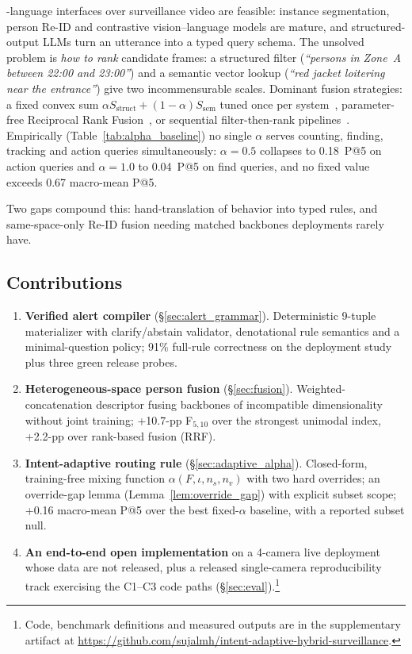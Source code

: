 ﻿\documentclass[conference]{IEEEtran}
\theoremstyle{plain}
\begin{document}
-language interfaces over surveillance video are feasible: instance segmentation, person Re-ID and contrastive vision--language models are mature, and structured-output LLMs turn an utterance into a typed query schema. The unsolved problem is \emph{how to rank} candidate frames: a structured filter (\textit{``persons in Zone~A between 22:00 and 23:00''}) and a semantic vector lookup (\textit{``red jacket loitering near the entrance''}) give two incommensurable scales. Dominant fusion strategies: a fixed convex sum $\alpha S_{\text{struct}} + (1-\alpha) S_{\text{sem}}$ tuned once per system~\cite{b7,b12,b29}, parameter-free Reciprocal Rank Fusion~\cite{b27}, or sequential filter-then-rank pipelines~\cite{b30}. Empirically (Table~\ref{tab:alpha_baseline}) no single $\alpha$ serves counting, finding, tracking and action queries simultaneously: $\alpha=0.5$ collapses to 0.18~P@5 on action queries and $\alpha=1.0$ to 0.04~P@5 on find queries, and no fixed value exceeds 0.67 macro-mean P@5.

Two gaps compound this: hand-translation of behavior into typed rules, and same-space-only Re-ID fusion needing matched backbones deployments rarely have.

\subsection*{Contributions}
\begin{enumerate}
\item \textbf{Verified alert compiler} (\S\ref{sec:alert_grammar}). Deterministic 9-tuple materializer with clarify/abstain validator, denotational rule semantics and a minimal-question policy; 91\% full-rule correctness on the deployment study plus three green release probes.
\item \textbf{Heterogeneous-space person fusion} (\S\ref{sec:fusion}). Weighted-concatenation descriptor fusing backbones of incompatible dimensionality without joint training; +10.7-pp F$_{5,10}$ over the strongest unimodal index, +2.2-pp over rank-based fusion (RRF).
\item \textbf{Intent-adaptive routing rule} (\S\ref{sec:adaptive_alpha}). Closed-form, training-free mixing function $\alpha(F,\iota,n_s,n_v)$ with two hard overrides; an override-gap lemma (Lemma~\ref{lem:override_gap}) with explicit subset scope; +0.16 macro-mean P@5 over the best fixed-$\alpha$ baseline, with a reported subset null.
\item \textbf{An end-to-end open implementation} on a 4-camera live deployment whose data are not released, plus a released single-camera reproducibility track exercising the C1--C3 code paths (\S\ref{sec:eval}).\footnote{Code, benchmark definitions and measured outputs are in the supplementary artifact at \url{https://github.com/sujalmh/intent-adaptive-hybrid-surveillance}.}
\end{enumerate}
\end{document}
